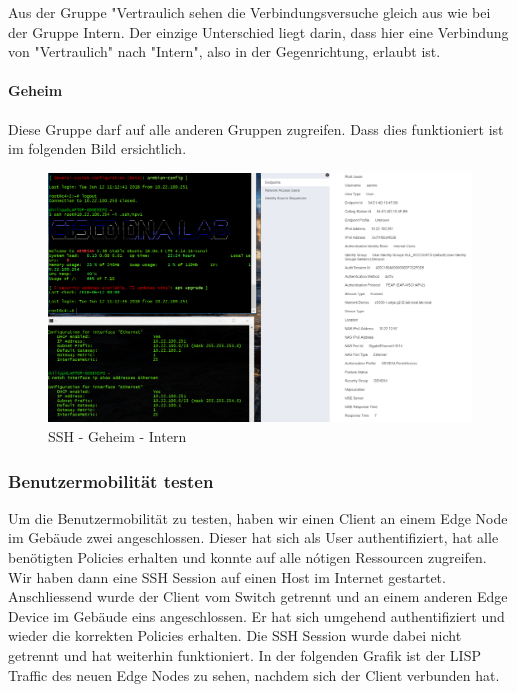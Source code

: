 Aus der Gruppe "Vertraulich sehen die Verbindungsversuche gleich aus wie bei der Gruppe Intern. Der einzige Unterschied liegt darin, dass hier eine Verbindung von "Vertraulich" nach "Intern", also in der Gegenrichtung, erlaubt ist.

\paragraph{Geheim}

Diese Gruppe darf auf alle anderen Gruppen zugreifen. Dass dies funktioniert ist im folgenden Bild ersichtlich.

\begin{figure}[H]
	\centering
	\includegraphics[width=14cm]{img/secondtry/ssh-geheim-intern.png}
	\caption{SSH - Geheim - Intern}
	\label{fig:ssh-geheim-intern}
\end{figure}

\subsubsection{Benutzermobilität testen}

Um die Benutzermobilität zu testen, haben wir einen Client an einem Edge Node im Gebäude zwei angeschlossen. Dieser hat sich als User authentifiziert, hat alle benötigten Policies erhalten und konnte auf alle nótigen Ressourcen zugreifen. 
Wir haben dann eine SSH Session auf einen Host im Internet gestartet.
Anschliessend wurde der Client vom Switch getrennt und an einem anderen Edge Device im Gebäude eins angeschlossen. Er hat sich umgehend authentifiziert und wieder die korrekten Policies erhalten. Die SSH Session wurde dabei nicht getrennt und hat weiterhin funktioniert.
In der folgenden Grafik ist der LISP Traffic des neuen Edge Nodes zu sehen, nachdem sich der Client verbunden hat.


